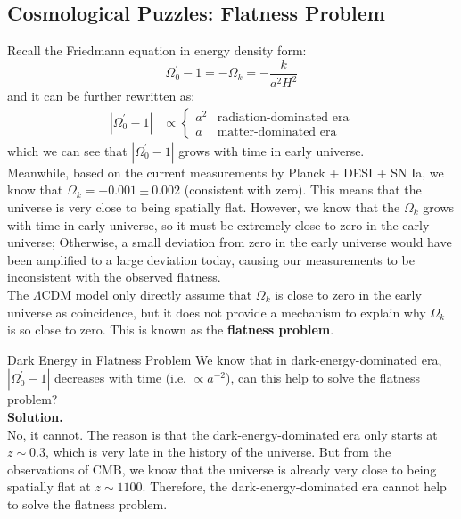 \subsection{Cosmological Puzzles: Flatness Problem}
\begin{intuition}
    Recall the Friedmann equation in energy density form:
    \[
        \Omega_0^{'} - 1 = - \Omega_k = - \frac{k}{a^2 H^2}
    \]
    and it can be further rewritten as:
    \begin{align*}
        | \Omega_0^{'} - 1 | &\propto \begin{cases}
            a^2 & \text{radiation-dominated era} \\
            a & \text{matter-dominated era}
        \end{cases}
    \end{align*}
    which we can see that $| \Omega_0^{'} - 1 |$ grows with time in early universe. \\

    Meanwhile, based on the current measurements by Planck + DESI + SN Ia, we know that $\Omega_k = -0.001 \pm 0.002$ (consistent with zero). This means that the universe is very close to being spatially flat. However, we know that the $\Omega_k$ grows with time in early universe, so it must be extremely close to zero in the early universe; Otherwise, a small deviation from zero in the early universe would have been amplified to a large deviation today, causing our measurements to be inconsistent with the observed flatness. \\

    The $\Lambda$CDM model only directly assume that $\Omega_k$ is close to zero in the early universe as coincidence, but it does not provide a mechanism to explain why $\Omega_k$ is so close to zero. This is known as the \textbf{flatness problem}.
\end{intuition}

\clearpage
\begin{example}{Dark Energy in Flatness Problem}{}
    We know that in dark-energy-dominated era, $| \Omega_0^{'} - 1 |$ decreases with time (i.e. $\propto a^{-2}$), can this help to solve the flatness problem? \\

    \bigskip\textbf{Solution.}\quad \\
    No, it cannot. The reason is that the dark-energy-dominated era only starts at $z \sim 0.3$, which is very late in the history of the universe. But from the observations of CMB, we know that the universe is already very close to being spatially flat at $z \sim 1100$. Therefore, the dark-energy-dominated era cannot help to solve the flatness problem.
\end{example}

